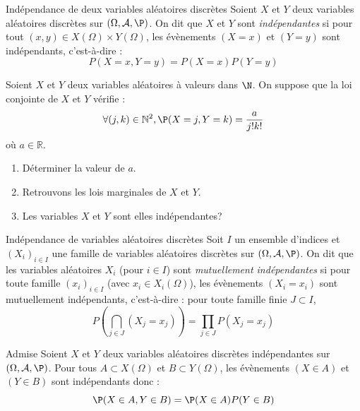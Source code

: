 \documentclass[french,11pt,twoside]{VcCours}
\begin{document}
\begin{Definition}{Indépendance de deux variables aléatoires discrètes}
Soient $X$ et $Y$ deux variables aléatoires discrètes sur $(\Omega, \mathcal{A}, \P)$. On dit que $X$ et $Y$ sont \emph{indépendantes} si pour tout $(x,y) \in X(\Omega) \times Y(\Omega)$, les évènements $(X=x)$ et $(Y=y)$ sont indépendants, c'est-à-dire :
$$ P(X=x,Y=y)=P(X=x)P(Y=y)$$
\end{Definition}

\begin{Exemple}{} Soient $X$ et $Y$ deux variables aléatoires à valeurs dans $\N$. On suppose que la loi conjointe de $X$ et $Y$ vérifie :
  \[
  \forall (j,k) \in \mathbb{N}^2,  \P( X = j,Y = k ) = \frac{a}{j!k!}
  \]
où $a \in \mathbb{R}$.
  \begin{enumerate}
  \item
    Déterminer la valeur de $a$.
    
    \vspace*{4cm}
  \item
    Retrouvons les lois marginales de $X$ et $Y$.
    
    \vspace*{5cm}
  \item
    Les variables $X$ et $Y$ sont elles indépendantes?
    
    \vspace*{3cm}
  \end{enumerate}
\end{Exemple}

\begin{Definition}{Indépendance de variables aléatoires discrètes}
Soit $I$ un ensemble d'indices et $(X_i)_{i \in I}$ une famille de variables aléatoires discrètes sur $(\Omega, \mathcal{A}, \P)$. On dit que les variables aléatoires $X_i$ (pour $i \in I$) sont \emph{mutuellement indépendantes} si pour toute famille $(x_i)_{i \in I}$ (avec $x_i \in X_i(\Omega)$), les évènements $(X_i=x_i)$ sont mutuellement indépendants, c'est-à-dire : pour toute famille finie $J \subset I$,
$$ P \left( \bigcap_{j \in J} (X_j=x_j) \right) = \prod_{j \in J} P(X_j=x_j)$$
\end{Definition}


\begin{Proposition}{Admise} Soient $X$ et $Y$ deux variables aléatoires discrètes indépendantes sur $(\Omega, \mathcal{A}, \P)$.  Pour tous $A \subset X(\Omega)$ et $B \subset Y(\Omega)$, les évènements $(X \in A)$ et $(Y \in B)$ sont indépendants donc :
$$ \P(X \in A, Y \in B) = \P(X \in A) P(Y \in B)$$
\end{Proposition}
\end{document}
